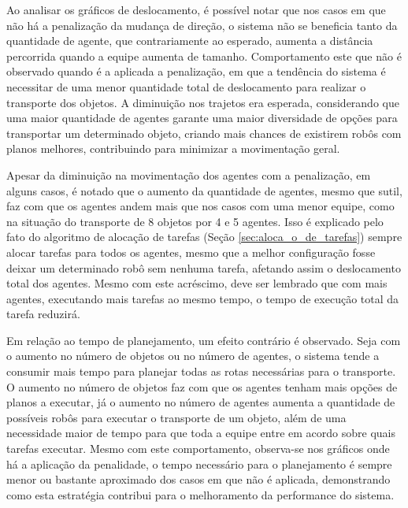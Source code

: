 
Ao analisar os gráficos de deslocamento, é possível notar que nos casos em que não há a penalização da mudança de direção, o sistema não se beneficia tanto da quantidade de agente, que contrariamente ao esperado, aumenta a distância percorrida quando a equipe aumenta de tamanho.
Comportamento este que não é observado quando é a aplicada a penalização, em que a tendência do sistema é necessitar de uma menor quantidade total de deslocamento para realizar o transporte dos objetos.
A diminuição nos trajetos era esperada, considerando que uma maior quantidade de agentes garante uma maior diversidade de opções para transportar um determinado objeto, criando mais chances de existirem robôs com planos melhores, contribuindo para minimizar a movimentação geral.

Apesar da diminuição na movimentação dos agentes com a penalização, em alguns casos, é notado que o aumento da quantidade de agentes, mesmo que sutil, faz com que os agentes andem mais que nos casos com uma menor equipe, como na situação do transporte de 8 objetos por 4 e 5 agentes.
Isso é explicado pelo fato do algoritmo de alocação de tarefas (Seção \ref{sec:aloca_o_de_tarefas}) sempre alocar tarefas para todos os agentes, mesmo que a melhor configuração fosse deixar um determinado robô sem nenhuma tarefa, afetando assim o deslocamento total dos agentes.
Mesmo com este acréscimo, deve ser lembrado que com mais agentes, executando mais tarefas ao mesmo tempo, o tempo de execução total da tarefa reduzirá.

Em relação ao tempo de planejamento, um efeito contrário é observado. Seja com o aumento no número de objetos ou no número de agentes, o sistema tende a consumir mais tempo para planejar todas as rotas necessárias para o transporte.
O aumento no número de objetos faz com que os agentes tenham mais opções de planos a executar, já o aumento no número de agentes aumenta a quantidade de possíveis robôs para executar o transporte de um objeto, além de uma necessidade maior de tempo para que toda a equipe entre em acordo sobre quais tarefas executar.
Mesmo com este comportamento, observa-se nos gráficos onde há a aplicação da penalidade, o tempo necessário para o planejamento é sempre menor ou bastante aproximado dos casos em que não é aplicada, demonstrando como esta estratégia contribui para o melhoramento da performance do sistema.



